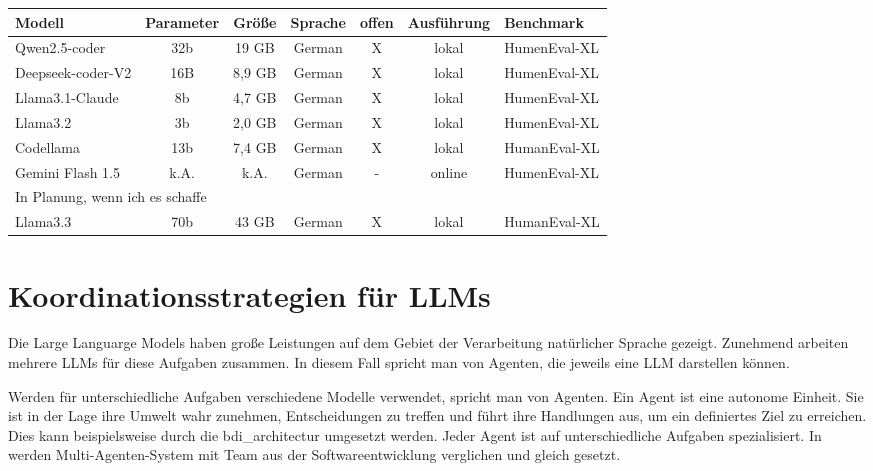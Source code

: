 \begin{table}[!ht]
	\begin{tabular}{|l|c|c|c|c|c|l|}
		\hline
		\textbf{Modell} & \textbf{Parameter} & \textbf{Größe} & \textbf{Sprache} & \textbf{offen} & \textbf{Ausführung}  & \textbf{Benchmark} \\
		\hline
		Qwen2.5-coder     & 32b &  19 GB & German & X & lokal  & HumenEval-XL \\
		Deepseek-coder-V2 & 16B & 8,9 GB & German &  X & lokal  & HumenEval-XL \\
		Llama3.1-Claude   &  8b & 4,7 GB & German &  X & lokal  & HumenEval-XL \\
		Llama3.2          &  3b & 2,0 GB & German &  X & lokal  & HumenEval-XL \\
		Codellama         & 13b & 7,4 GB & German &  X & lokal  & HumanEval-XL \\
		Gemini Flash 1.5  & k.A.& k.A.   & German &  - & online & HumenEval-XL \\
		\hline
		\multicolumn{7}{|l|}{In Planung, wenn ich es schaffe} \\
		\hline
		Llama3.3          & 70b &  43 GB & German &  X & lokal  & HumanEval-XL \\
		\hline
	\end{tabular}
\end{table}



\section{Koordinationsstrategien für LLMs}
Die Large Languarge Models haben große Leistungen auf dem Gebiet der Verarbeitung natürlicher Sprache gezeigt. Zunehmend arbeiten mehrere LLMs für diese Aufgaben zusammen. In diesem Fall spricht man von Agenten, die jeweils eine LLM darstellen können.\vspace{0.2cm}

Werden für unterschiedliche Aufgaben verschiedene Modelle verwendet, spricht man von Agenten. Ein Agent ist eine autonome Einheit. Sie ist in der Lage ihre Umwelt wahr zunehmen, Entscheidungen zu treffen und führt ihre Handlungen aus, um ein definiertes Ziel zu erreichen. Dies kann beispielsweise durch die \gls{bdi_architectur} umgesetzt werden. Jeder Agent ist auf unterschiedliche Aufgaben spezialisiert. In \cite{du-2024} werden Multi-Agenten-System mit Team aus der Softwareentwicklung verglichen und gleich gesetzt.\vspace{0.2cm}


